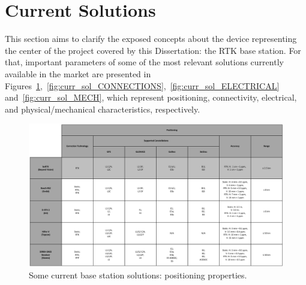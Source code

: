 

\section{Current Solutions}\label{sec:II_curr_solutions}

This section aims to clarify the exposed concepts about the device representing the center of the project covered by this Dissertation: the RTK base station. For that, important parameters of some of the most relevant solutions currently available in the market are presented in Figures~\ref{fig:curr_sol_POSITIONING},~\ref{fig:curr_sol_CONNECTIONS},~\ref{fig:curr_sol_ELECTRICAL} and~\ref{fig:curr_sol_MECH}, which represent positioning, connectivity, electrical, and physical/mechanical characteristics, respectively.

\begin{figure}[h]
	\centering
    \includegraphics[width=1.0\textwidth]{Chapters/Figures/curr_solutions/POSITIONING_v2.pdf}
    \caption{Some current base station solutions: positioning properties.}
	\label{fig:curr_sol_POSITIONING}
\end{figure}

